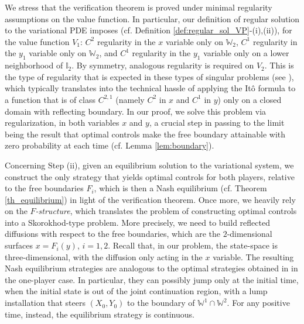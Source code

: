 \documentclass[10pt]{article}
\numberwithin{equation}{section}
\theoremstyle{plain}
\numberwithin{theorem}{section}
\theoremstyle{definition}
\newcommand{\<}{\langle}
\renewcommand{\>}{\rangle}
\renewcommand{\(}{\left(}
\renewcommand{\)}{\right)}
\begin{document}
{We stress that the verification theorem is proved under minimal regularity assumptions on the value function. In particular, our definition of regular solution to the variational PDE imposes (cf. Definition \ref{def:regular_sol_VP}-(i),(ii)), for the value function $V_1$: $C^2$ regularity in the $x$ variable only on $\mathbb{W}_2$, $C^1$ regularity in the $y_1$ variable only on $\mathbb{W}_2$, and $C^1$ regularity in the $y_1$ variable only on a lower neighborhood of $\mathbb{I}_2$. By symmetry, analogous regularity is required on $V_2$. This is the type of regularity that is expected in these types of singular problems (see \cite{cai2023change}), which typically translates into the technical hassle of applying the It\^o formula %
 to a function that is of class $C^{2,1}$ (namely $C^2$ in $x$ and $C^1$ in $y$) only on a closed domain with reflecting boundary. In our proof, we solve this problem via regularization, in both variables $x$ and $y$, a crucial step in passing to the limit being the result that optimal controls make the free boundary attainable with zero probability at each time (cf. Lemma \ref{lem:boundary}). 


Concerning Step (ii), given an equilibrium solution to the variational system, we construct the only strategy that yields optimal controls for both players, relative to the free boundaries $F_i$, which is then a Nash equilibrium (cf. Theorem \ref{th_equilibrium}) in light of the verification theorem. Once more, we heavily rely on the \emph{$F$-structure}, which translates the problem of constructing optimal controls into a Skorokhod-type problem. More precisely, we need to build reflected diffusions with respect to the free boundaries, which are the $2$-dimensional surfaces $x = F_i(y)$, $i = 1,2$. Recall that, in our problem, the state-space is three-dimensional, with the diffusion only acting in the $x$ variable. The resulting Nash equilibrium strategies are analogous to the optimal strategies obtained in \cite{MR4305783} in the one-player case. In particular, they can possibly jump only at the initial time, when the initial state is out of the joint continuation region, with a lump installation that steers $(X_0, Y_0)$ to the boundary of $\mathbb{W}^1 \cap \mathbb{W}^2$. For any positive time, instead, the equilibrium strategy is continuous. 

}
\end{document}
